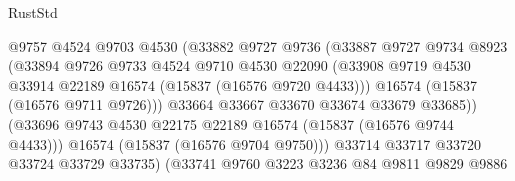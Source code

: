 \begin{lexlean}{RustStd}
\begin{coremodule}
{\begin{coremodule}
{{{{{{{{{{{{{{{{{{{{{{{{{{{{{{{{{{{{{{{{{{{{{{{{{{{{{{{{{{{{                                    @9757
                                    @4524
                                    @9703
                                    @4530
                                    (@33882
                                      @9727
                                      @9736
                                      (@33887
                                        @9727
                                        @9734
                                        @8923
                                        (@33894
                                          @9726
                                          @9733
                                          @4524
                                          @9710
                                          @4530
                                          @22090
                                          (@33908
                                            @9719
                                            @4530
                                            @33914
                                            @22189
                                            @16574
                                            (@15837 (@16576 @9720 @4433)))
                                          @16574
                                          (@15837 (@16576 @9711 @9726)))
                                        @33664
                                        @33667
                                        @33670
                                        @33674
                                        @33679
                                        @33685))
                                    (@33696
                                      @9743
                                      @4530
                                      @22175
                                      @22189
                                      @16574
                                      (@15837 (@16576 @9744 @4433)))
                                    @16574
                                    (@15837 (@16576 @9704 @9750)))
                                  @33714
                                  @33717
                                  @33720
                                  @33724
                                  @33729
                                  @33735)
                                (@33741
                                  @9760
                                  @3223
                                  @3236
                                  @84
                                  @9811
                                  @9829
                                  @9886
}}}}}}}}}}}}}}}}}}}}}}}}}}}}}}}}}}}}}}}}}}}}}}}}}}}}}}}}}}}}
\end{coremodule}}
\end{coremodule}
\end{lexlean}

